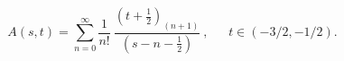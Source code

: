 \begin{equation}
A(s,t)=
\sum_{n=0}^\infty
\frac{1}{n!}\
\frac{(t+\frac{1}{2})_{(n+1)}}{(s-n-\frac{1}{2})}\ ,
\ \ \ \ \ \ \  t \in (-3/2,-1/2).
\label{4}
\end{equation}

